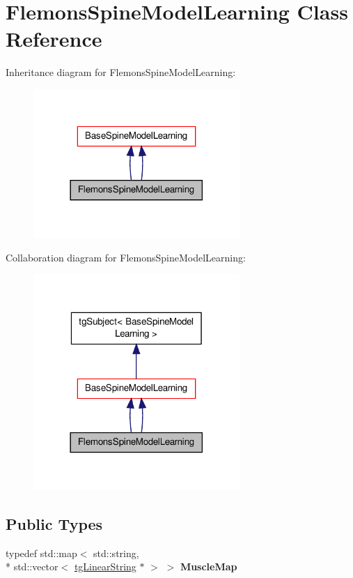 \hypertarget{class_flemons_spine_model_learning}{\section{Flemons\-Spine\-Model\-Learning Class Reference}
\label{class_flemons_spine_model_learning}
}


Inheritance diagram for Flemons\-Spine\-Model\-Learning\-:\nopagebreak
\begin{figure}[H]
\begin{center}
\leavevmode
\includegraphics[width=222pt]{class_flemons_spine_model_learning__inherit__graph}
\end{center}
\end{figure}


Collaboration diagram for Flemons\-Spine\-Model\-Learning\-:\nopagebreak
\begin{figure}[H]
\begin{center}
\leavevmode
\includegraphics[width=222pt]{class_flemons_spine_model_learning__coll__graph}
\end{center}
\end{figure}
\subsection*{Public Types}
\begin{DoxyCompactItemize}
\item 
\hypertarget{class_base_spine_model_learning_a0f779ad979f0353d68af012f50f822b7}{typedef std\-::map$<$ std\-::string, \\*
std\-::vector$<$ \hyperlink{classtg_linear_string}{tg\-Linear\-String} $\ast$ $>$ $>$ {\bfseries Muscle\-Map}}\label{class_base_spine_model_learning_a0f779ad979f0353d68af012f50f822b7}

\end{DoxyCompactItemize}
